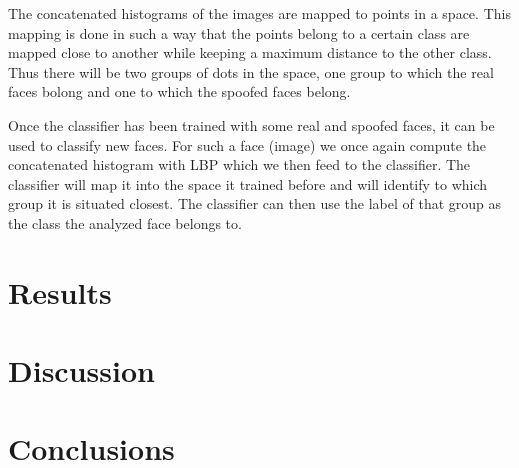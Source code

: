 \documentclass{sig-alternate-br}
\begin{document}
The concatenated histograms of the images are mapped to points in a space. This mapping is done in such a way that the points belong to a certain class are mapped close to another while keeping a maximum distance to the other class. Thus there will be two groups of dots in the space, one group to which the real faces bolong and one to which the spoofed faces belong.

Once the classifier has been trained with some real and spoofed faces, it can be used to classify new faces. For such a face (image) we once again compute the concatenated histogram with LBP which we then feed to the classifier. The classifier will map it into the space it trained before and will identify to which group it is situated closest. The classifier can then use the label of that group as the class the analyzed face belongs to.

\section{Results} \label{results}


\section{Discussion} \label{discussion}

\section{Conclusions} \label{conclusions}




\balancecolumns
\end{document}
